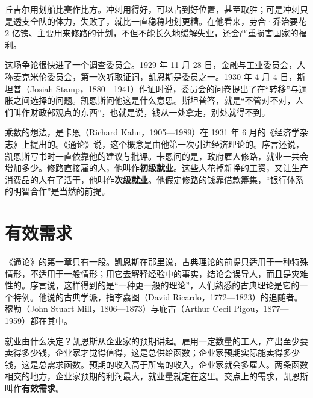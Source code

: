 丘吉尔用划船比赛作比方。冲刺用得好，可以占到好位置，甚至取胜；可是冲刺只是透支全队的体力，失败了，就比一直稳稳地划更糟\cite{hansard1929}。在他看来，劳合·乔治要花 2 亿镑、主要用来修路的计划，不但不能长久地缓解失业，还会严重损害国家的福利\cite{hansard1929}。

这场争论很快进了一个调查委员会。1929 年 11 月 28 日，金融与工业委员会，人称麦克米伦委员会，第一次听取证词，凯恩斯是委员之一\cite{macmillan1931}。1930 年 4 月 4 日，斯坦普（Josiah Stamp，1880—1941）作证时说，委员会的问卷提出了在“转移”与通胀之间选择的问题。凯恩斯问他这是什么意思。斯坦普答，就是“不管对不对，人们叫作财政部观点的东西”，也就是说，钱从一处拿走，别处就得不到\cite{macmillan1931,loc32}。

乘数的想法，是卡恩（Richard Kahn，1905—1989）在 1931 年 6 月的《经济学杂志》上提出的\cite{kahn1931,bnf32}。《通论》说，这个概念是由他第一次引进经济理论的。序言还说，凯恩斯写书时一直依靠他的建议与批评\cite{keynes1936}。卡恩问的是，政府雇人修路，就业一共会增加多少\cite{kahn1931}。修路直接雇的人，他叫作\textbf{初级就业}。这些人花掉新挣的工资，又让生产消费品的人有了活干，他叫作\textbf{次级就业}\cite{kahn1931}。他假定修路的钱靠借款筹集，“银行体系的明智合作”是当然的前提\cite{kahn1931}。

\section{有效需求}\label{sec:generaltheory-demand}

《通论》的第一章只有一段。凯恩斯在那里说，古典理论的前提只适用于一种特殊情形，不适用于一般情形；用它去解释经验中的事实，结论会误导人，而且是灾难性的\cite{keynes1936}。序言说，这样得到的是“一种更一般的理论”，人们熟悉的古典理论是它的一个特例\cite{keynes1936}。他说的古典学派，指李嘉图（David Ricardo，1772—1823）的追随者\cite{keynes1936,loc32}。穆勒（John Stuart Mill，1806—1873）与庇古（Arthur Cecil Pigou，1877—1959）都在其中\cite{keynes1936,loc32}。

就业由什么决定？凯恩斯从企业家的预期讲起。雇用一定数量的工人，产出至少要卖得多少钱，企业家才觉得值得，这是总供给函数；企业家预期实际能卖得多少钱，这是总需求函数\cite{keynes1936}。预期的收入高于所需的收入，企业家就会多雇人。两条函数相交的地方，企业家预期的利润最大，就业量就定在这里。交点上的需求，凯恩斯叫作\textbf{有效需求}\cite{keynes1936}。

